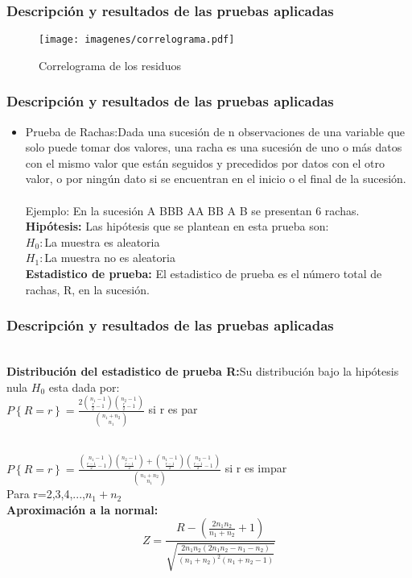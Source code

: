 \documentclass[12pt]{beamer}
\begin{document}
\begin{frame}
\frametitle{Descripción y resultados de las pruebas aplicadas}
\begin{figure}[!h]
    \begin{center}
        \texttt{[image: imagenes/correlograma.pdf]}
        \caption{Correlograma de los residuos}
        \label{fig:Densidad}
    \end{center}
\end{figure}
\end{frame}

\begin{frame}
\frametitle{Descripción y resultados de las pruebas aplicadas}
\begin{itemize}
\item Prueba de Rachas:Dada una sucesión de n observaciones de una variable que solo puede tomar dos valores, una racha es una sucesión de uno o más datos con el mismo valor que están seguidos y precedidos por datos con el otro valor, o por ningún dato si se encuentran en el inicio o el final de la sucesión.
~\\ Ejemplo: En la sucesión A BBB AA BB A B se presentan 6 rachas.
~\\ \textbf{Hipótesis:} Las hipótesis que se plantean en esta prueba son:
~\\$H_{0}:$La muestra es aleatoria
~\\$H_{1}:$La muestra no es aleatoria
~\\ \textbf{Estadistico de prueba:} El estadistico de prueba es el número total de rachas, R, en la sucesión.
\end{itemize}
\end{frame}

\begin{frame}
\frametitle{Descripción y resultados de las pruebas aplicadas}
~\\ \textbf{Distribución del estadistico de prueba R:}Su distribución bajo la hipótesis nula $H_{0}$ esta dada por:
~\\$P\left\lbrace{R=r}\right\rbrace=\frac{2\binom{n_{1}-1}{\frac{r}{2}-1}\binom{n_{2}-1}{\frac{r}{2}-1}}{\binom{n_{1}+n_{2}}{n_{1}}}$ si r es par

~\\$P\left\lbrace{R=r}\right\rbrace=\frac{\binom{n_{1}-1}{\frac{r-1}{2}-1}\binom{n_{2}-1}{\frac{r-1}{2}}+\binom{n_{1}-1}{\frac{r-1}{2}}\binom{n_{2}-1}{\frac{r-1}{2}-1}}{\binom{n_{1}+n_{2}}{n_{1}}}$ si r es impar
~\\Para r=2,3,4,...,$n_{1}+n_{2}$
~\\ \textbf{Aproximación a la normal:}
$$Z=\frac{R-\left(\frac{2n_{1}n_{2}}{n_{1}+n_{2}}+1\right)}{\sqrt{\frac{2n_{1}n_{2}(2n_{1}n_{2}-n_{1}-n_{2})}{(n_{1}+n_{2})^2 (n_{1}+n_{2}-1)}}} $$
\end{frame}
\end{document}
